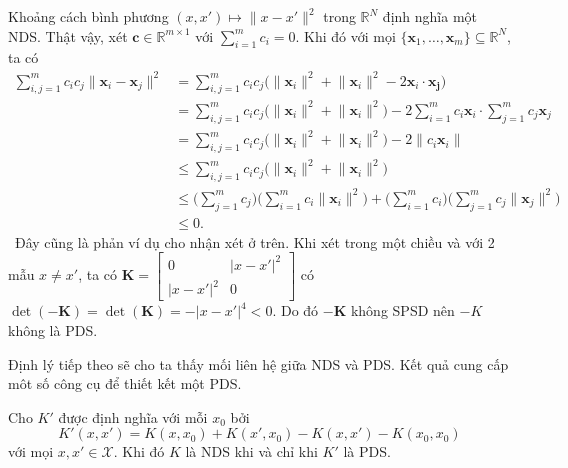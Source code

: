 \begin{exmp}
  Khoảng cách bình phương $(x, x') \mapsto \lVert x - x' \rVert^2$ trong
  $\mathbb{R}^N$ định nghĩa một  NDS. Thật vậy, xét $\mathbf{c} \in
  \mathbb{R}^{m \times 1}$ với $\sum_{i=1}^m c_i = 0$. Khi đó với mọi
  $\{\mathbf{x}_1, \dots, \mathbf{x}_m\} \subseteq \mathbb{R}^N$, ta có
  \begin{align}
    \sum_{i, j = 1}^m c_ic_j \lVert \mathbf{x}_i - \mathbf{x}_j \rVert^2 &=
      \sum_{i, j = 1}^m c_ic_j \bigl(\lVert \mathbf{x}_i\rVert^2 + \lVert
      \mathbf{x}_i\rVert^2 - 2\mathbf{x}_i \cdot \mathbf{x_j} \bigr) \\
    &= \sum_{i, j = 1}^m c_ic_j \bigl(\lVert \mathbf{x}_i\rVert^2 + \lVert
      \mathbf{x}_i\rVert^2 \bigr) - 2 \sum_{i = 1}^m c_i\mathbf{x}_i\cdot
      \sum_{j = 1}^m c_j \mathbf{x}_j \\
    &= \sum_{i, j = 1}^m c_ic_j \bigl(\lVert \mathbf{x}_i\rVert^2 + \lVert
      \mathbf{x}_i\rVert^2 \bigr) - 2 \biggl\lVert c_i\mathbf{x}_i\biggr\rVert
      \\
    &\le \sum_{i, j = 1}^m c_ic_j \bigl(\lVert \mathbf{x}_i\rVert^2 + \lVert
      \mathbf{x}_i\rVert^2 \bigr) \\
    &\le \biggl(\sum_{j = 1}^m c_j\biggr) \biggl( \sum_{i = 1}^m c_i \lVert
    \mathbf{x}_i \rVert^2 ) + \biggl(\sum_{i = 1}^m c_i\biggr) \biggl( \sum_{j
    = 1}^m c_j \lVert \mathbf{x}_j \rVert^2 \biggr) \\
    &\le 0.
  \end{align}
  \elaborate\ Đây cũng là phản ví dụ cho nhận xét ở trên. Khi xét trong một
  chiều và với 2 mẫu $x\ne x'$, ta có $\mathbf{K} = \begin{bmatrix}
    0 & \lvert x - x' \rvert^2 \\
    \lvert x - x' \rvert^2 & 0
  \end{bmatrix}$ có $\det(-\mathbf{K}) = \det(\mathbf{K}) = - \lvert x - x'
  \rvert^4 < 0$. Do đó $-\mathbf{K}$ không SPSD nên $-K$ không là PDS.
\end{exmp}

Định lý tiếp theo sẽ cho ta thấy mối liên hệ giữa  NDS và PDS. Kết
quả cung cấp môt số công cụ để thiết kết một  PDS.

\begin{thm}\label{thm:nds-pds}
  Cho $K'$ được định nghĩa với mỗi $x_0$ bởi \begin{equation}
    K'(x, x') = K(x, x_0) + K(x', x_0) - K(x, x') - K(x_0, x_0)
  \end{equation}với mọi $x, x' \in \mathcal{X}$. Khi đó $K$ là NDS khi và chỉ
  khi $K'$ là PDS.
\end{thm}

